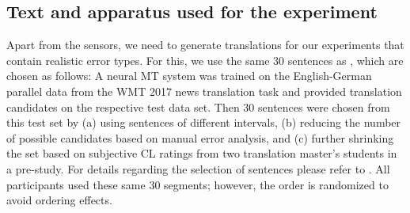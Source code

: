 \documentclass[output=paper]{langsci/langscibook}
\begin{document}
\subsection{Text and apparatus used for the experiment}\largerpage
Apart from the sensors, we need to generate translations for our experiments that contain realistic error types. For this, we use the same 30 sentences as \citet{herbig2019mt}, which are chosen as follows: %
A neural MT system \citep{Gehring:2017:fair} was trained on the English-German parallel data from the WMT 2017 news translation task and provided translation candidates on the respective test data set. %
Then 30 sentences were chosen from this test set by (a) using sentences of different \ter{} intervals, (b) reducing the number of possible candidates based on manual error analysis, and (c) further shrinking the set based on subjective CL ratings from two translation master's students in a pre-study. For details regarding the selection of sentences please refer to \cite{herbig2019mt}.
All participants used these same 30 segments; however, the order is randomized to avoid ordering effects. %
\end{document}
